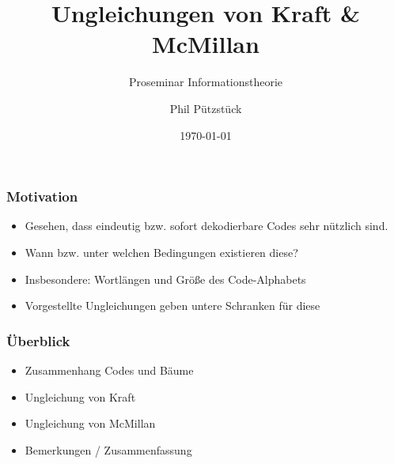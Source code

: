 \documentclass{beamer}
\title{Ungleichungen von Kraft \& McMillan}
\subtitle{Proseminar Informationstheorie}
\author{Phil Pützstück}
\date{\today}
\begin{document}
\maketitle

\begin{frame}
    \frametitle{Motivation}
    \begin{itemize}
        \setlength\itemsep{2em}
        \item Gesehen, dass eindeutig bzw. sofort dekodierbare Codes sehr nützlich sind.
        \item Wann bzw. unter welchen Bedingungen existieren diese?
        \item Insbesondere: Wortlängen und Größe des Code-Alphabets
        \item Vorgestellte Ungleichungen geben untere Schranken für diese
    \end{itemize}
\end{frame}

\begin{frame}
    \frametitle{Überblick}
    \begin{itemize}
        \setlength\itemsep{2em}
        \item Zusammenhang Codes und Bäume
        \item Ungleichung von Kraft
        \item Ungleichung von McMillan
        \item Bemerkungen / Zusammenfassung
    \end{itemize}
\end{frame}
\end{document}
